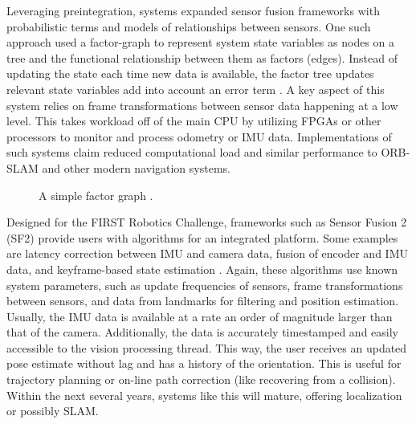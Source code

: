\documentclass{article}
\begin{document}
        Leveraging preintegration, systems expanded sensor fusion frameworks with probabilistic terms and models of relationships between sensors. One such approach used a factor-graph to represent system state variables as nodes on a tree and the functional relationship between them as factors (edges). Instead of updating the state each time new data is available, the factor tree updates relevant state variables add into account an error term \cite{vadim_indelman_information_2013}. A key aspect of this system relies on frame transformations between sensor data happening at a low level. This takes workload off of the main CPU by utilizing FPGAs or other processors to monitor and process odometry or IMU data. Implementations of such systems claim reduced computational load and similar performance to ORB-SLAM and other modern navigation systems.

    \begin{figure}[H]
      \centering
      \label{fig:ex_factor_graph}
      \caption{A simple factor graph \cite{hwymeers_example_2008}.}
    \end{figure}

      Designed for the FIRST Robotics Challenge, frameworks such as Sensor Fusion 2 (SF2) provide users with algorithms for an integrated platform. Some examples are latency correction between IMU and camera data, fusion of encoder and IMU data, and keyframe-based state estimation \cite{kauai_labs_inc_video_2017}. Again, these algorithms use known system parameters, such as update frequencies of sensors, frame transformations between sensors, and data from landmarks for filtering and position estimation. Usually, the IMU data is available at a rate an order of magnitude larger than that of the camera. Additionally, the data is accurately timestamped and easily accessible to the vision processing thread. This way, the user receives an updated pose estimate without lag and has a history of the orientation. This is useful for trajectory planning or on-line path correction (like recovering from a collision). Within the next several years, systems like this will mature, offering localization or possibly SLAM.
\end{document}
